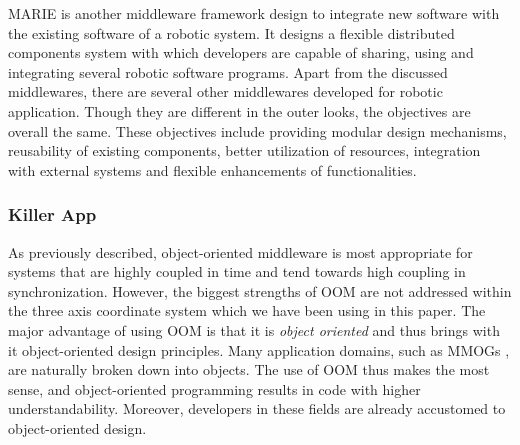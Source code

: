 \documentclass{acm_proc_article-sp}
\begin{document}
MARIE is another middleware framework design to integrate new software with the existing software of a robotic system. It designs a flexible distributed components system with which developers are capable of sharing, using and integrating several robotic software programs.
Apart from the discussed middlewares, there are several other middlewares developed for robotic application. Though they are different in the outer looks, the objectives are overall the same. These objectives include providing modular design mechanisms, reusability of existing components, better utilization of resources, integration with external systems and flexible enhancements of functionalities.











\subsubsection{Killer App}
\label{sec:appsobjgood}



As previously described, object-oriented middleware is most appropriate for systems that are highly coupled in time and tend towards high coupling in synchronization.  However, the biggest strengths of OOM are not addressed within the three axis coordinate system which we have been using in this paper.  The major advantage of using OOM is that it is \textit{object oriented} and thus brings with it object-oriented design principles.  Many application domains, such as MMOGs \cite{Denault:2008p8364}, are naturally broken down into objects.  The use of OOM thus makes the most sense, and object-oriented programming results in code with higher understandability.  Moreover, developers in these fields are already accustomed to object-oriented design.
\end{document}
